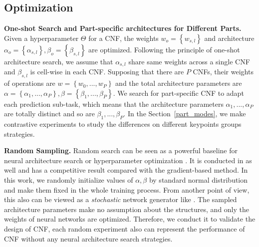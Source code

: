 \documentclass[journal]{IEEEtran}
\begin{document}
\subsection{Optimization}
\label{optimization}
\textbf{One-shot Search and Part-specific architectures for Different Parts.} Given a hyperparameter $\Theta$ for a CNF, the weights $w_o=\left\{w_{s, l} \right\}$ and architecture $\alpha_o=\left\{\alpha_{s, l} \right\}, \beta_o=\left\{\beta_{s,l} \right\} $ are optimized. Following the principle of one-shot architecture search\cite{elsken2018neural}, we assume that  $\alpha_{s,l}$ share same weights across a single CNF and $\beta_{s,l} $ is cell-wise in each CNF. Supposing that there are $P$ CNFs, their weights of operations are $w=\left\{w_0,...,w_P \right\}$ and the total architecture parameters are $\alpha=\left\{\alpha_1,...,\alpha_P \right\}, \beta=\left\{\beta_1,...,\beta_P \right\}$. We search for part-specific CNF to adapt each prediction sub-task, which means that the architecture parameters $\alpha_1,...,\alpha_P$ are totally distinct and so are $\beta_1,...,\beta_P$. In the Section~\ref{part_modes}, we make contrastive experiments to study the differences on different keypoints groups strategies.


\textbf{Random Sampling.} Random search can be seen as a powerful baseline for neural architecture search or hyperparameter optimization \cite{Xie_2019_ICCV,bergstra2012random,li2019random}. It is conducted in \cite{liu2018darts} as well and has a competitive result compared with the gradient-based method. In this work, we randomly initialize values of $\alpha,\beta$ by standard normal distribution and make them fixed in the whole training process.   From another point of view, this also can be viewed as a \emph{stochastic} network generator like \cite{Xie_2019_ICCV}. The sampled architecture parameters make no assumption about the structures, and only the weights of neural networks are optimized. Therefore, we conduct it to validate the design of CNF, each random experiment also can represent the performance of CNF without any neural architecture search strategies.
\end{document}

